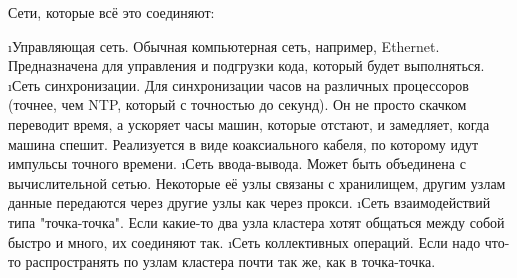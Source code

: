  Сети, которые всё это соединяют:
 \begin{enumerate}
  \i Управляющая сеть.
  Обычная компьютерная сеть, например, Ethernet. Предназначена для управления и подгрузки кода, который будет выполняться.
  \i Сеть синхронизации. Для синхронизации часов на различных процессоров (точнее, чем NTP, который с точностью до секунд). Он не просто скачком переводит время, а ускоряет часы машин, которые отстают, и замедляет, когда машина спешит. Реализуется в виде коаксиального кабеля, по которому идут импульсы точного времени.
  \i Сеть ввода-вывода. Может быть объединена с вычислительной сетью.
   Некоторые её узлы связаны с хранилищем, другим узлам данные передаются через другие узлы как через прокси.
  \i Сеть взаимодействий типа "точка-точка". Если какие-то два узла кластера хотят общаться между собой быстро и много, их соединяют так.
  \i Сеть коллективных операций. Если надо что-то распространять по узлам кластера почти так же, как в точка-точка.
\end{enumerate}

